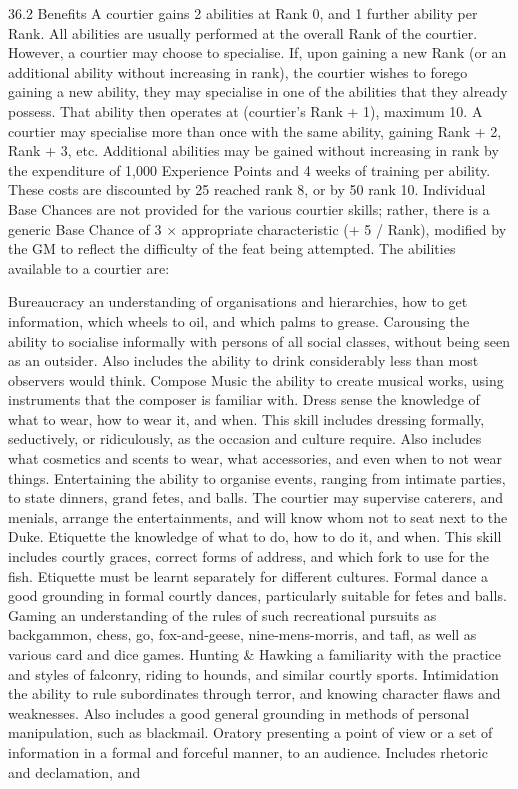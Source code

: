 \documentclass[a4paper]{article}
\begin{document}
\begin{multicols}{3}
36.2 Benefits
A courtier gains 2 abilities at Rank 0, and 1 further
ability per Rank. All abilities are usually performed
at the overall Rank of the courtier. However, a
courtier may choose to specialise. If, upon gaining
a new Rank (or an additional ability without increasing in rank), the courtier wishes to forego
gaining a new ability, they may specialise in one of
the abilities that they already possess. That ability
then operates at (courtier’s Rank + 1), maximum
10. A courtier may specialise more than once with
the same ability, gaining Rank + 2, Rank + 3, etc.
Additional abilities may be gained without increasing in rank by the expenditure of 1,000 Experience
Points and 4 weeks of training per ability. These
costs are discounted by 25%
reached rank 8, or by 50%
rank 10.
Individual Base Chances are not provided for the
various courtier skills; rather, there is a generic
Base Chance of 3 × appropriate characteristic (+ 5 /
Rank), modified by the GM to reflect the difficulty
of the feat being attempted.
The abilities available to a courtier are:

Bureaucracy an understanding of organisations
and hierarchies, how to get information, which
wheels to oil, and which palms to grease.
Carousing the ability to socialise informally with
persons of all social classes, without being seen as
an outsider. Also includes the ability to drink considerably less than most observers would think.
Compose Music the ability to create musical
works, using instruments that the composer is
familiar with.
Dress sense the knowledge of what to wear, how
to wear it, and when. This skill includes dressing
formally, seductively, or ridiculously, as the occasion and culture require. Also includes what cosmetics and scents to wear, what accessories, and
even when to not wear things.
Entertaining the ability to organise events, ranging from intimate parties, to state dinners, grand
fetes, and balls. The courtier may supervise caterers, and menials, arrange the entertainments, and
will know whom not to seat next to the Duke.
Etiquette the knowledge of what to do, how to do
it, and when. This skill includes courtly graces,
correct forms of address, and which fork to use for
the fish. Etiquette must be learnt separately for
different cultures.
Formal dance a good grounding in formal courtly
dances, particularly suitable for fetes and balls.
Gaming an understanding of the rules of such
recreational pursuits as backgammon, chess, go,
fox-and-geese, nine-mens-morris, and tafl, as well
as various card and dice games.
Hunting & Hawking a familiarity with the practice and styles of falconry, riding to hounds, and
similar courtly sports.
Intimidation the ability to rule subordinates
through terror, and knowing character flaws and
weaknesses. Also includes a good general grounding in methods of personal manipulation, such as
blackmail.
Oratory presenting a point of view or a set of
information in a formal and forceful manner, to an
audience. Includes rhetoric and declamation, and


\end{multicols}
\end{document}
